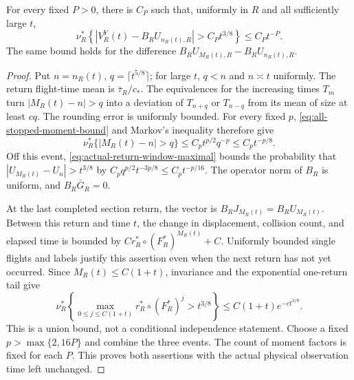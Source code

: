 \begin{proposition}
\label{prop:physical-window-coupling}
For every fixed $P>0$, there is $C_P$ such that, uniformly in $R$ and
all sufficiently large $t$,
\begin{equation}\label{eq:physical-window-coupling}
 \nu_R^*\left\{
   |V_R^Y(t)-B_RU_{n_R(t),R}|>C_P t^{3/8}
          \right\}\le C_Pt^{-P}.
\end{equation}
The same bound holds for the difference
$B_RU_{M_R(t),R}-B_RU_{n_R(t),R}$.
\end{proposition}
\begin{proof}
Put $n=n_R(t)$, $q=\lceil t^{5/8}\rceil$; for large $t$, $q<n$
and $n\asymp t$ uniformly. The return flight-time mean is
$\bar\tau_R/c_*$. The equivalences for the increasing times $T_m$
turn $|M_R(t)-n|>q$ into a deviation of $T_{n+q}$ or $T_{n-q}$
from its mean of size at least $c q$. The rounding error is uniformly
bounded. For every fixed $p$, \eqref{eq:all-stopped-moment-bound}
and Markov's inequality therefore give
\[
 \nu_R^*\{|M_R(t)-n|>q\}\le C_p t^{p/2}q^{-p}
                                      \le C_p t^{-p/8}.
\]
Off this event, \eqref{eq:actual-return-window-maximal} bounds the
probability that $|U_{M_R(t)}-U_n|>t^{3/8}$ by
$C_p q^{p/2}t^{-3p/8}\le C_p t^{-p/16}$. The operator norm of
$B_R$ is uniform, and $B_R\bar G_R=0$.

At the last completed section return, the vector is
$B_RJ_{M_R(t)}=B_RU_{M_R(t)}$. Between this return and time $t$,
the change in displacement, collision count, and elapsed time is
bounded by $C r_R^*\circ(F_R^*)^{M_R(t)}+C$. Uniformly bounded
single flights and labels justify this assertion even when the next
return has not yet occurred. Since $M_R(t)\le C(1+t)$,
invariance and the exponential one-return tail give
\[
 \nu_R^*\left\{\max_{0\le j\le C(1+t)}r_R^*\circ(F_R^*)^j
                                               >t^{3/8}\right\}
       \le C(1+t)e^{-ct^{3/8}}.
\]
This is a union bound, not a conditional independence statement.
Choose a fixed $p>\max\{2,16P\}$ and combine the three events.
The count of moment factors is fixed for each $P$. This proves both
assertions with the actual physical observation time left unchanged.
\end{proof}

